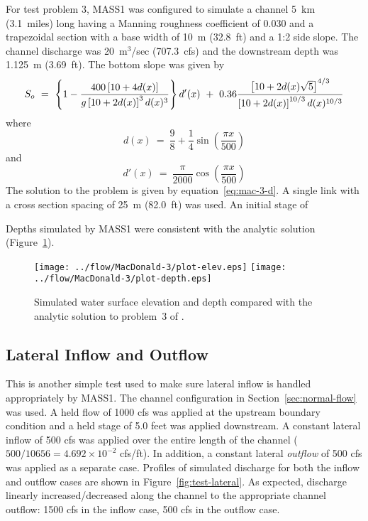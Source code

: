\documentclass[12pt,dvips,letterpaper]{article}
\begin{document}
For test problem 3, MASS1 was configured to simulate a channel 5~km
(3.1~miles) long having a Manning roughness coefficient of 0.030 and a
trapezoidal section with a base width of 10~m (32.8~ft) and a 1:2 side
slope.  The channel discharge was 20~m$^{3}$/sec (707.3~cfs) and the
downstream depth was 1.125~m (3.69~ft).  The bottom slope was given by
\begin{equation}
  S_{o} ~ = ~ \left\{ 1 - { { 400 \left[ 10 + 4d(x) \right] } \over { g
  \left[ 10 + 2d(x) \right]^{3} d(x)^{3} } } \right\} d'(x)
  ~ + ~ 0.36 { { \left[ 10 + 2d(x)\sqrt{5} \right]^{4 \slash 3} } \over {
  \left[ 10 + 2d(x) \right]^{10 \slash 3} d(x)^{10 \slash 3} } } \nonumber
\end{equation}
where 
\begin{equation}
  \label{eq:mac-3-d}
  d(x) ~ = ~ \frac{9}{8} + \frac{1}{4} \sin \left(\frac{\pi x}{500}\right)
\end{equation}
and
\begin{equation}
  d'(x) ~ = ~ \frac{\pi}{2000} \cos \left(\frac{\pi x}{500}\right) \nonumber
\end{equation}
The solution to the problem is given by equation~\ref{eq:mac-3-d}.
A single link with a cross section spacing of 25~m (82.0~ft) was
used.  An initial stage of 

Depths simulated by MASS1 were consistent with the analytic solution
(Figure~\ref{fig:macdonald-3-results}).  

\begin{figure}[hbtp]
  \centering
  \texttt{[image: ../flow/MacDonald-3/plot-elev.eps]}
  \texttt{[image: ../flow/MacDonald-3/plot-depth.eps]}  
  \caption{Simulated water surface elevation and depth compared with the
    analytic solution to problem~3 of \cite{macdonald97:_analytic}.}
  \label{fig:macdonald-3-results}
\end{figure}

\subsection{Lateral Inflow and Outflow}
\label{sec:test-lateral}

This is another simple test used to make sure lateral inflow is
handled appropriately by MASS1.  The channel configuration in
Section~\ref{sec:normal-flow} was used. A held flow of 1000 cfs was
applied at the upstream boundary condition and a held stage of 5.0
feet was applied downstream.  A constant lateral inflow of 500 cfs was
applied over the entire length of the channel ($500 \slash 10656 = 4.692
\times 10^{-2}$ cfs/ft).  In addition, a constant lateral
\textit{outflow} of 500 cfs was applied as a separate case.  Profiles
of simulated discharge for both the inflow and outflow cases are shown
in Figure~\ref{fig:test-lateral}.  As expected, discharge linearly
increased/decreased along the channel to the appropriate channel
outflow: 1500 cfs in the inflow case, 500 cfs in the outflow case.
\end{document}
